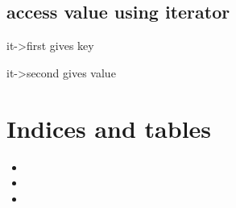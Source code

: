 \documentclass[letterpaper,10pt,english]{sphinxmanual}
\begin{document}
\section{access value using iterator}
\label{map:access-value-using-iterator}
it-\textgreater{}first gives key

it-\textgreater{}second gives value


\chapter{Indices and tables}
\label{index:indices-and-tables}\begin{itemize}
\item {} 

\item {} 

\item {} 

\end{itemize}



\renewcommand{\indexname}{Index}
\printindex
\end{document}
